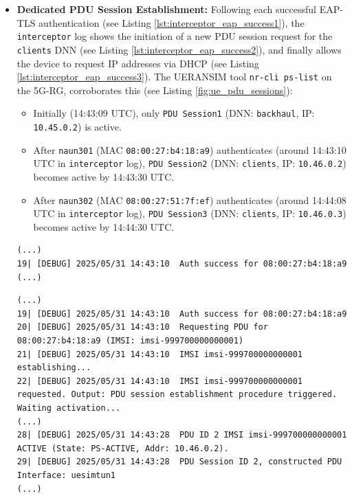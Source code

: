 \begin{itemize}
    \item{
        \textbf{Dedicated \ac{PDU} Session Establishment:} Following each successful \ac{EAP-TLS} authentication (see Listing \ref{lst:interceptor_eap_success1}), the \texttt{interceptor} log shows the initiation of a new \ac{PDU} session request for the \texttt{clients} \ac{DNN} (see Listing \ref{lst:interceptor_eap_success2}), and finally allows the device to request \ac{IP} addresses via \ac{DHCP}  (see Listing \ref{lst:interceptor_eap_success3}). The UERANSIM tool \texttt{nr-cli ps-list} on the \ac{5G-RG}, corroborates this (see Listing \ref{fig:ue_pdu_sessions}):
        \begin{itemize}
            \item Initially (14:43:09 \ac{UTC}), only \texttt{PDU Session1} (\ac{DNN}: \texttt{backhaul}, \ac{IP}: \texttt{10.45.0.2}) is active.
            
            \item After \texttt{naun301} (\ac{MAC} \texttt{08:00:27:b4:18:a9}) authenticates (around 14:43:10 \ac{UTC} in \texttt{interceptor} log), \texttt{PDU Session2} (\ac{DNN}: \texttt{clients}, \ac{IP}: \texttt{10.46.0.2}) becomes active by 14:43:30 \ac{UTC}.

            \item After \texttt{naun302} (\ac{MAC} \texttt{08:00:27:51:7f:ef}) authenticates (around 14:44:08 \ac{UTC} in \texttt{interceptor} log), \texttt{PDU Session3} (\ac{DNN}: \texttt{clients}, \ac{IP}: \texttt{10.46.0.3}) becomes active by 14:44:30 \ac{UTC}.
        \end{itemize}

\begin{lstlisting}[caption=\texttt{interceptor} captures authentication success,label={lst:interceptor_eap_success1}]
(...)
19| [DEBUG] 2025/05/31 14:43:10  Auth success for 08:00:27:b4:18:a9
(...)
\end{lstlisting}

\begin{lstlisting}[caption=\texttt{interceptor} requests \acs{PDU} session,label={lst:interceptor_eap_success2}]
(...)
19| [DEBUG] 2025/05/31 14:43:10  Auth success for 08:00:27:b4:18:a9
20| [DEBUG] 2025/05/31 14:43:10  Requesting PDU for 08:00:27:b4:18:a9 (IMSI: imsi-999700000000001)
21| [DEBUG] 2025/05/31 14:43:10  IMSI imsi-999700000000001 establishing...
22| [DEBUG] 2025/05/31 14:43:10  IMSI imsi-999700000000001 requested. Output: PDU session establishment procedure triggered. Waiting activation...
(...)
28| [DEBUG] 2025/05/31 14:43:28  PDU ID 2 IMSI imsi-999700000000001 ACTIVE (State: PS-ACTIVE, Addr: 10.46.0.2).
29| [DEBUG] 2025/05/31 14:43:28  PDU Session ID 2, constructed PDU Interface: uesimtun1
(...)
\end{lstlisting}

}
\end{itemize}
